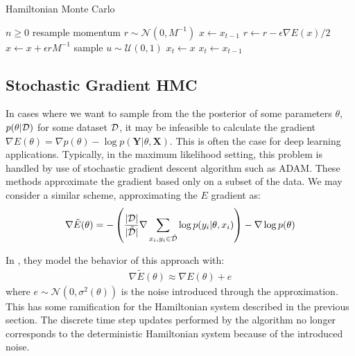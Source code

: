 \begin{algorithm}[H]
    \caption{Hamiltonian Monte Carlo} \label{alg:hmc}
    \begin{algorithmic}
        \Require $n \geq 0$
        \State resample momentum $r \sim \mathcal{N}(0, M^{-1})$
        \State $x \gets x_{t-1}$
        \State $r \gets r - \epsilon \nabla E(x)/2$ 
        \State $x\gets x + \epsilon r M^{-1} $ 
        \EndFor
        \State sample $u \sim \mathcal{U}(0, 1)$
        \State $x_{t} \gets x$
        \Else
        \State $x_{t} \gets x_{t-1}$
        \EndIf
        \EndFor
    \end{algorithmic}
\end{algorithm}


\subsection{Stochastic Gradient HMC}

In cases where we want to sample from the the posterior of some parameters $\theta$,  $p(\theta | \mathcal{D})$ for some dataset $\mathcal{D}$, it may be infeasible to calculate the gradient $\nabla E(\theta) = \nabla p(\theta) - \log{p(\bm{Y} | \theta, \bm{X})}$. 
This is often the case for deep learning applications.
Typically, in the maximum likelihood setting, this problem is handled by use of stochastic gradient descent algorithm such as ADAM. 
These methods approximate the gradient based only on a subset of the data. 
We may consider a similar scheme, approximating the $E$ gradient as:
\begin{align*}
    \nabla\tilde{E}(\theta) = -\left(\frac{|\mathcal{D}|}{|\tilde{\mathcal{D}}|}  \nabla \sum_{x_i, y_i\in \tilde{\mathcal{D}}} \log{p(y_i |\theta, x_i)}\right)  -\nabla \log{p(\theta)}
\end{align*}

In \cite{chen_stochastic_2014}, they model the behavior of this approach with:
\begin{align} \label{eq:sghmc-model}
    \nabla\tilde{E}(\theta) \approx \nabla{E}(\theta) + e
\end{align}
where $e \sim \mathcal{N}(0, \sigma^2(\theta))$ is the noise introduced through the approximation.
This has some ramification for the Hamiltonian system described in the previous section. 
The discrete time step updates performed by the algorithm no longer corresponds to the deterministic Hamiltonian system because of the introduced noise. 

